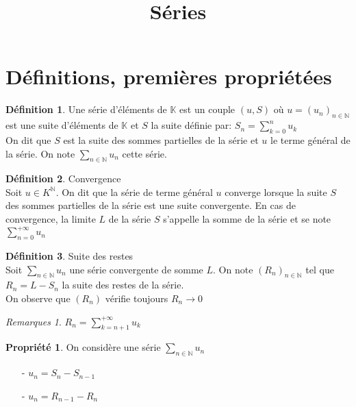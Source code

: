 \documentclass[fleqn]{article}
\title{S\'eries}
\date{}
\theoremstyle{definition} \newtheorem*{defi}{D\'efinition}
\theoremstyle{definition} \newtheorem*{theo}{Th\'eor\`eme}
\theoremstyle{definition} \newtheorem*{coro}{Corollaire}
\theoremstyle{remark} \newtheorem*{rqs}{Remarques}
\theoremstyle{definition} \newtheorem*{prop}{Propri\'et\'e}
\begin{document}
\maketitle

\section{D\'efinitions, premi\`eres propri\'et\'ees}

\begin{defi} Une s\'erie d'\'el\'ements de $\mathbb{K}$ est un couple $(u,S)$ o\`u $u = (u_n)_{n \in \mathbb{N}}$ est une suite d'\'el\'ements de
$\mathbb{K}$ et $S$ la suite d\'efinie par: $S_n = \sum_{k=0}^n u_k$\\
On dit que $S$ est la suite des sommes partielles de la s\'erie et $u$ le terme g\'en\'eral de la s\'erie. On note $\sum_{n \in \mathbb{N}} u_n$
cette s\'erie.
\end{defi}

\begin{defi} Convergence \\
Soit $u \in K^{\mathbb{N}}$. On dit que la s\'erie de terme g\'en\'eral $u$ converge lorsque la suite $S$ des sommes partielles de la s\'erie
est une suite convergente. En cas de convergence, la limite $L$ de la s\'erie $S$ s'appelle la somme de la s\'erie et se note
$\sum_{n=0}^{+\infty} u_n$
\end{defi}

\begin{defi} Suite des restes \\
	Soit $\sum_{n \in \mathbb{N}} u_n$ une s\'erie convergente de somme $L$. On note $(R_n)_{n \in \mathbb{N}}$ tel que $R_n = L - S_n$ la suite
	des restes de la s\'erie.\\
	On observe que $(R_n)$ v\'erifie toujours $R_n \rightarrow 0$

	\begin{rqs}
		$R_n = \sum_{k = n+1}^{+\infty} u_k$
	\end{rqs}
\end{defi}

\begin{prop} On consid\`ere une s\'erie $\sum_{n \in \mathbb{N}} u_n$
	\begin{enumerate}
		\item [-] $u_n = S_n - S_{n-1}$
		\item [-] $u_n = R_{n-1} - R_n$
	\end{enumerate}
\end{prop}
\end{document}

